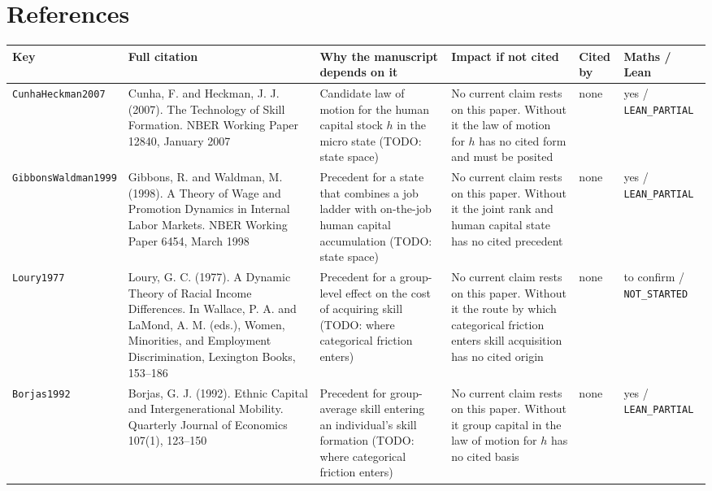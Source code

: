 \documentclass[10pt]{article}
\begin{document}
\section{References}
{\small
\begin{longtable}{>{\raggedright\arraybackslash}p{2.7cm} >{\raggedright\arraybackslash}p{5.0cm} >{\raggedright\arraybackslash}p{5.4cm} >{\raggedright\arraybackslash}p{5.4cm} >{\raggedright\arraybackslash}p{1.8cm} >{\raggedright\arraybackslash}p{2.6cm}}
\toprule Key & Full citation & Why the manuscript depends on it & Impact if not cited & Cited by & Maths / Lean \\ \midrule \endhead
\nolinkurl{CunhaHeckman2007} & Cunha, F. and Heckman, J. J. (2007). The Technology of Skill Formation. NBER Working Paper 12840, January 2007 & Candidate law of motion for the human capital stock $h$ in the micro state (TODO: state space) & No current claim rests on this paper. Without it the law of motion for $h$ has no cited form and must be posited & none & yes / \texttt{LEAN\_PARTIAL} \\ \midrule
\nolinkurl{GibbonsWaldman1999} & Gibbons, R. and Waldman, M. (1998). A Theory of Wage and Promotion Dynamics in Internal Labor Markets. NBER Working Paper 6454, March 1998 & Precedent for a state that combines a job ladder with on-the-job human capital accumulation (TODO: state space) & No current claim rests on this paper. Without it the joint rank and human capital state has no cited precedent & none & yes / \texttt{LEAN\_PARTIAL} \\ \midrule
\nolinkurl{Loury1977} & Loury, G. C. (1977). A Dynamic Theory of Racial Income Differences. In Wallace, P. A. and LaMond, A. M. (eds.), Women, Minorities, and Employment Discrimination, Lexington Books, 153--186 & Precedent for a group-level effect on the cost of acquiring skill (TODO: where categorical friction enters) & No current claim rests on this paper. Without it the route by which categorical friction enters skill acquisition has no cited origin & none & to confirm / \texttt{NOT\_STARTED} \\ \midrule
\nolinkurl{Borjas1992} & Borjas, G. J. (1992). Ethnic Capital and Intergenerational Mobility. Quarterly Journal of Economics 107(1), 123--150 & Precedent for group-average skill entering an individual's skill formation (TODO: where categorical friction enters) & No current claim rests on this paper. Without it group capital in the law of motion for $h$ has no cited basis & none & yes / \texttt{LEAN\_PARTIAL} \\ \midrule

\end{longtable}}
\end{document}

